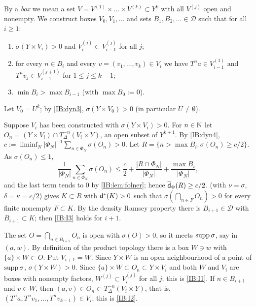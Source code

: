 By a \emph{box} we mean a set $V=V^{(1)}\times\dots\times V^{(k)}\subset Y^k$ with all
$V^{(j)}$ open and nonempty. We construct boxes $V_0,V_1,\ldots$ and sets
$B_1,B_2,\ldots\in\mathcal D$ such that for all $i\ge1$:
\begin{enumerate}[label=\textup{(I\arabic*)}]
\item\label{IB:I1} $\sigma(Y\times V_i)>0$ and $V_i^{(j)}\subset V_{i-1}^{(j)}$ for all $j$;
\item\label{IB:I2} for every $n\in B_i$ and every $v=(v_1,\dots,v_k)\in V_i$ we have
$T^na\in V_{i-1}^{(1)}$ and $T^nv_j\in V_{i-1}^{(j+1)}$ for $1\le j\le k-1$;
\item\label{IB:I3} $\min B_i>\max B_{i-1}$ (with $\max B_0:=0$).
\end{enumerate}
Let $V_0=U^k$; by \ref{IB:dyn3}, $\sigma(Y\times V_0)>0$ (in particular $U\neq\emptyset$).

Suppose $V_i$ has been constructed with $\sigma(Y\times V_i)>0$. For $n\in\mathbb{N}$ let
$O_n=(Y\times V_i)\cap T_\Delta^{-n}(V_i\times Y)$, an open subset of $Y^{k+1}$. By
\ref{IB:dyn4}, $c:=\liminf_N|\Phi_N|^{-1}\sum_{n\in\Phi_N}\sigma(O_n)>0$. Let
$R=\{n>\max B_i:\sigma(O_n)\ge c/2\}$. As $\sigma(O_n)\le1$,
\[
\frac1{|\Phi_N|}\sum_{n\in\Phi_N}\sigma(O_n)\le\frac c2+\frac{|R\cap\Phi_N|}{|\Phi_N|}
+\frac{\max B_i}{|\Phi_N|},
\]
and the last term tends to $0$ by \cref{IB:lem:folner}; hence $\overline{\mathsf{d}}_\Phi(R)\ge c/2$.
 (with $\nu=\sigma$, $\delta=\kappa=c/2$) gives $K\subset R$ with
$\mathsf{d}^*(K)>0$ such that $\sigma(\bigcap_{n\in F}O_n)>0$ for every finite nonempty
$F\subset K$. By the density Ramsey property there is $B_{i+1}\in\mathcal D$ with
$B_{i+1}\subset K$; then \ref{IB:I3} holds for $i+1$.

The set $O=\bigcap_{n\in B_{i+1}}O_n$ is open with $\sigma(O)>0$, so it meets
$\operatorname{supp}\sigma$, say in $(a,w)$. By definition of the product topology there is a
box $W\ni w$ with $\{a\}\times W\subset O$. Put $V_{i+1}=W$. Since $Y\times W$ is an
open neighbourhood of a point of $\operatorname{supp}\sigma$, $\sigma(Y\times W)>0$. Since
$\{a\}\times W\subset O_n\subset Y\times V_i$ and both $W$ and $V_i$ are boxes with nonempty
factors, $W^{(j)}\subset V_i^{(j)}$ for all $j$; this is \ref{IB:I1}. If $n\in B_{i+1}$
and $v\in W$, then $(a,v)\in O_n\subset T_\Delta^{-n}(V_i\times Y)$, that is,
$(T^na,T^nv_1,\dots,T^nv_{k-1})\in V_i$; this is \ref{IB:I2}.

